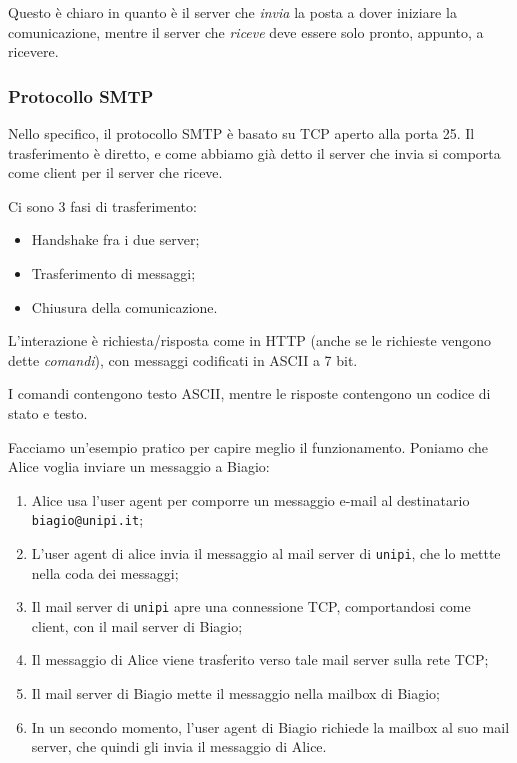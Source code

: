 \documentclass[a4paper,11pt]{article}
\begin{document}
Questo è chiaro in quanto è il server che \textit{invia} la posta a dover iniziare la comunicazione, mentre il server che \textit{riceve} deve essere solo pronto, appunto, a ricevere.

\subsubsection{Protocollo SMTP}
Nello specifico, il protocollo SMTP è basato su TCP aperto alla porta 25.
Il trasferimento è diretto, e come abbiamo già detto il server che invia si comporta come client per il server che riceve.

Ci sono 3 fasi di trasferimento:
\begin{itemize}
	\item Handshake fra i due server;
	\item Trasferimento di messaggi;
	\item Chiusura della comunicazione.
\end{itemize}

L'interazione è richiesta/risposta come in HTTP (anche se le richieste vengono dette \textit{comandi}), con messaggi codificati in ASCII a 7 bit.

I comandi contengono testo ASCII, mentre le risposte contengono un codice di stato e testo.

\par\smallskip

Facciamo un'esempio pratico per capire meglio il funzionamento. Poniamo che Alice voglia inviare un messaggio a Biagio:
\begin{enumerate}
	\item Alice usa l'user agent per comporre un messaggio e-mail al destinatario \lstinline|biagio@unipi.it|;
	\item L'user agent di alice invia il messaggio al mail server di \lstinline|unipi|, che lo mettte nella coda dei messaggi;
	\item Il mail server di \lstinline|unipi| apre una connessione TCP, comportandosi come client, con il mail server di Biagio;
	\item Il messaggio di Alice viene trasferito verso tale mail server sulla rete TCP;
	\item Il mail server di Biagio mette il messaggio nella mailbox di Biagio;
	\item In un secondo momento, l'user agent di Biagio richiede la mailbox al suo mail server, che quindi gli invia il messaggio di Alice. 
\end{enumerate}
\end{document}

